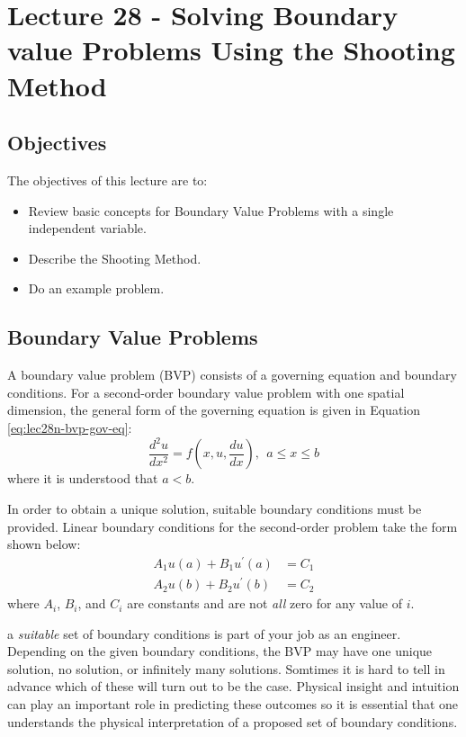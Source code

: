 \chapter{Lecture 28 - Solving Boundary value Problems Using the Shooting Method}
\label{ch:lec28n}
\section{Objectives}
The objectives of this lecture are to:
\begin{itemize}
\item Review basic concepts for Boundary Value Problems with a single independent variable.
\item Describe the Shooting Method.
\item Do an example problem.
\end{itemize}
\setcounter{lstannotation}{0}

\section{Boundary Value Problems}
A boundary value problem (BVP) consists of a governing equation and boundary conditions.  For a second-order boundary value problem with one spatial dimension, the general form of the governing equation is given in Equation \ref{eq:lec28n-bvp-gov-eq}:
\begin{equation}
\frac{d^2 u}{dx^2} = f\left(x,u,\frac{du}{dx}\right), \ \ a\le x \le b
\label{eq:lec28n-bvp-gov-eq}
\end{equation}
where it is understood that $a<b$.  

In order to obtain a unique solution, suitable boundary conditions must be provided.  Linear boundary conditions for the second-order problem take the form shown below:
\begin{align*}
A_1u(a)+B_1u^{\prime}(a)&=C_1 \\
A_2u(b)+B_2u^{\prime}(b)&=C_2
\end{align*}
where $A_i$, $B_i$, and $C_i$ are constants and are not \emph{all} zero for any value of $i$.

 a \emph{suitable} set of boundary conditions is part of your job as an engineer.  Depending on the given boundary conditions, the BVP may have one unique solution, no solution, or infinitely many solutions. Somtimes it is hard to tell in advance which of these will turn out to be the case.  Physical insight and intuition can play an important role in predicting these outcomes so it is essential that one understands the physical interpretation of a proposed set of boundary conditions.

